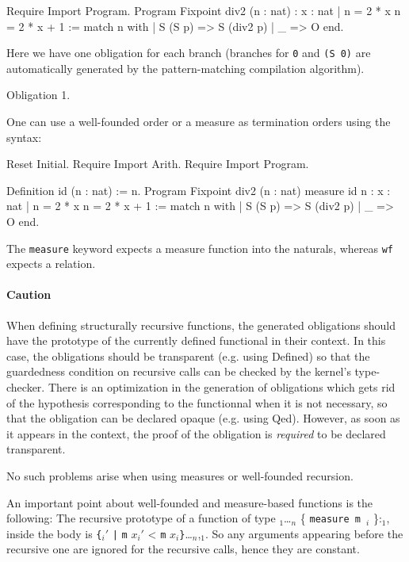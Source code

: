 \begin{coq_example}
Require Import Program.
Program Fixpoint div2 (n : nat) : { x : nat | n = 2 * x \/ n = 2 * x + 1 } :=
  match n with
  | S (S p) => S (div2 p)
  | _ => O
  end.
\end{coq_example}

Here we have one obligation for each branch (branches for \verb:0: and \verb:(S 0): are
automatically generated by the pattern-matching compilation algorithm).
\begin{coq_example}
  Obligation 1.
\end{coq_example}

One can use a well-founded order or a measure as termination orders using the syntax:
\begin{coq_eval}
Reset Initial.
Require Import Arith.
Require Import Program.
\end{coq_eval}
\begin{coq_example*}
Definition id (n : nat) := n.
Program Fixpoint div2 (n : nat) {measure id n} :
  { x : nat | n = 2 * x \/ n = 2 * x + 1 } :=
  match n with
  | S (S p) => S (div2 p)
  | _ => O
  end.
\end{coq_example*}

The \verb|measure| keyword expects a measure function into the naturals, whereas
\verb|wf| expects a relation.

\paragraph{Caution}
When defining structurally recursive functions, the
generated obligations should have the prototype of the currently defined functional
in their context. In this case, the obligations should be transparent
(e.g. using Defined) so that the guardedness condition on
recursive calls can be checked by the
kernel's type-checker. There is an optimization in the generation of
obligations which gets rid of the hypothesis corresponding to the
functionnal when it is not necessary, so that the obligation can be
declared opaque (e.g. using Qed). However, as soon as it appears in the
context, the proof of the obligation is \emph{required} to be declared transparent.

No such problems arise when using measures or well-founded recursion.

An important point about well-founded and measure-based functions is the following:
The recursive prototype of a function of type
{\binder$_1$}\ldots{\binder$_n$} \{ {\tt measure m \binder$_i$} \}:{\type$_1$}, 
inside the body is
\verb|{|{\binder$_i'$ \verb$|$ {\tt m} $x_i'$ < {\tt m} $x_i$}\verb|}|\ldots{\binder$_n$},{\type$_1$}. 
So any arguments appearing before the recursive one are ignored for the
recursive calls, hence they are constant.

